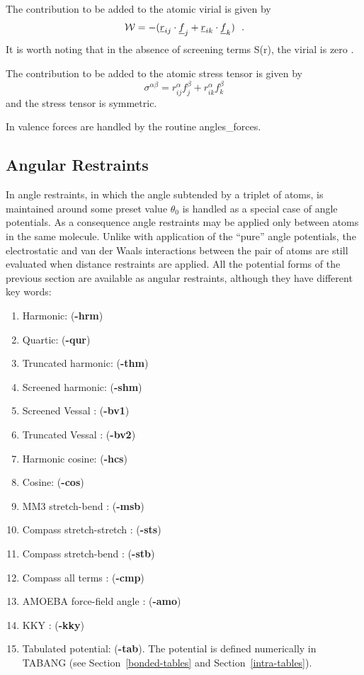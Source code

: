 The contribution to be added to the atomic virial is given by
\begin{equation}
{\cal W} = -(\mbox{$\underline{r}$}_{ij} \cdot \mbox{$\underline{f}$}_{j} + \mbox{$\underline{r}$}_{ik} \cdot
\mbox{$\underline{f}$}_{k})~~.
\end{equation}
It is worth noting that in the absence of screening terms S(r), the
virial is zero \cite{smith-93c}.

The contribution to be added to the atomic stress tensor is given by
\begin{equation}
\sigma^{\alpha \beta} = r_{ij}^{\alpha} f_{j}^{\beta} + r_{ik}^{\alpha} f_{k}^{\beta}
\end{equation}
and the stress tensor is symmetric.

In \D valence forces are handled by the routine {\sc
angles\_forces}.

\subsection{Angular Restraints}

In \D angle restraints, in which the angle subtended by a triplet
of atoms, is maintained around some preset value $\theta_{0}$ is
handled as a special case of angle potentials.  As a consequence
angle restraints may be applied only between atoms in the same
molecule.  Unlike with application of the ``pure'' angle
potentials, the electrostatic and
van der Waals interactions between
the pair of atoms are still evaluated when distance restraints are
applied.  All the potential forms of the previous section are
available as angular restraints, although they have different key
words:

\begin{enumerate}
\item Harmonic:  ({\bf -hrm})
\item Quartic:  ({\bf -qur})
\item Truncated harmonic:  ({\bf -thm})
\item Screened harmonic:  ({\bf -shm})
\item Screened Vessal \cite{vessal-94a}:  ({\bf -bv1})
\item Truncated Vessal \cite{smith-95a}:  ({\bf -bv2})
\item Harmonic cosine:  ({\bf -hcs})
\item Cosine:  ({\bf -cos})
\item MM3 stretch-bend \cite{allinger-89a}:  ({\bf -msb})
\item Compass stretch-stretch \cite{sun-98a}:  ({\bf -sts})
\item Compass stretch-bend \cite{sun-98a}:  ({\bf -stb})
\item Compass all terms \cite{sun-98a}:  ({\bf -cmp})
\item AMOEBA force-field angle \cite{ponder-10a}:  ({\bf -amo})
\item KKY \cite{kumagai-94a}:  ({\bf -kky})
\item Tabulated potential:  ({\bf -tab}).  The potential is defined numerically in TABANG (see Section~\ref{bonded-tables} and Section~\ref{intra-tables}).
\end{enumerate}

